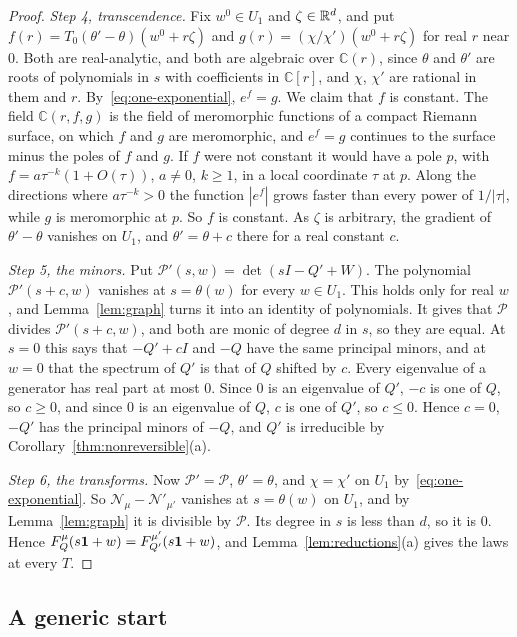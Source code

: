 \begin{proof}
\emph{Step 4, transcendence.} Fix $w^0\in U_1$ and $\zeta\in\mathbb{R}^d$, and put
$f(r)=T_0(\theta'-\theta)(w^0+r\zeta)$ and $g(r)=(\chi/\chi')(w^0+r\zeta)$ for real $r$ near $0$.
Both are real-analytic, and both are algebraic over $\mathbb C(r)$, since $\theta$ and $\theta'$
are roots of polynomials in $s$ with coefficients in $\mathbb C[r]$, and $\chi$, $\chi'$ are
rational in them and $r$. By~\eqref{eq:one-exponential}, $e^f=g$. We claim that $f$ is constant.
The field $\mathbb C(r,f,g)$ is the field of meromorphic functions of a compact Riemann surface,
on which $f$ and $g$ are meromorphic, and $e^f=g$ continues to the surface minus the poles of $f$
and $g$. If $f$ were not constant it would have a pole $p$, with $f=a\tau^{-k}(1+O(\tau))$, $a\ne0$,
$k\ge1$, in a local coordinate $\tau$ at $p$. Along the directions where $a\tau^{-k}>0$ the
function $|e^f|$ grows faster than every power of $1/|\tau|$, while $g$ is meromorphic at $p$.
So $f$ is constant. As $\zeta$ is arbitrary, the gradient of $\theta'-\theta$ vanishes on $U_1$,
and $\theta'=\theta+c$ there for a real constant $c$.

\emph{Step 5, the minors.} Put $\mathcal P'(s,w)=\det(sI-Q'+W)$. The polynomial
$\mathcal P'(s+c,w)$ vanishes at $s=\theta(w)$ for every $w\in U_1$. This holds only for real $w$,
and Lemma~\ref{lem:graph} turns it into an identity of polynomials. It gives that $\mathcal P$
divides $\mathcal P'(s+c,w)$, and both are monic of degree $d$ in $s$, so they are equal. At $s=0$
this says that $-Q'+cI$ and $-Q$ have the same principal minors, and at $w=0$ that the spectrum
of $Q'$ is that of $Q$ shifted by $c$. Every eigenvalue of a generator has real part at most $0$.
Since $0$ is an eigenvalue of $Q'$, $-c$ is one of $Q$, so $c\ge0$, and since $0$ is an eigenvalue
of $Q$, $c$ is one of $Q'$, so $c\le0$. Hence $c=0$, $-Q'$ has the principal minors of $-Q$, and
$Q'$ is irreducible by Corollary~\ref{thm:nonreversible}(a).

\emph{Step 6, the transforms.} Now $\mathcal P'=\mathcal P$, $\theta'=\theta$, and $\chi=\chi'$ on
$U_1$ by~\eqref{eq:one-exponential}. So $\mathcal N_\mu-\mathcal N'_{\mu'}$ vanishes at
$s=\theta(w)$ on $U_1$, and by Lemma~\ref{lem:graph} it is divisible by $\mathcal P$. Its degree
in $s$ is less than $d$, so it is $0$. Hence $F^\mu_Q(s\mathbf{1}+w)=F^{\mu'}_{Q'}(s\mathbf{1}+w)$, and
Lemma~\ref{lem:reductions}(a) gives the laws at every $T$.
\end{proof}

\subsection{A generic start}\label{sec:law-generic}

